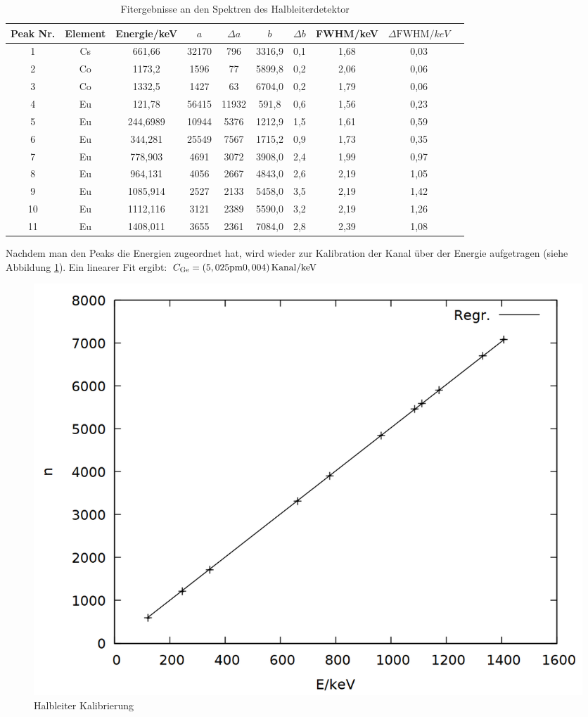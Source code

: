 \begin{table}
\caption{Fitergebnisse an den Spektren des Halbleiterdetektor}
\begin{tabular}{cccccccccc}
\toprule
Peak Nr. & Element & Energie/\si{keV}& $a$ & $\Delta a$ & $b$ & $\Delta b$ & FWHM/\si{keV} & $\Delta \text{FWHM}/\si{keV}$\\
\midrule 
1	&	Cs	&	661,66	&	32170	&	796	&	3316,9	&	0,1	&	1,68	&	0,03\\
2	&	Co	&	1173,2	&	1596	&	77	&	5899,8	&	0,2	&	2,06	&	0,06\\
3	&	Co	&	1332,5	&	1427	&	63	&	6704,0	&	0,2	&	1,79	&	0,06\\
4	&	Eu	&	121,78	&	56415	&	11932	&	591,8	&	0,6	&	1,56	&	0,23\\
5	&	Eu	&	244,6989	&	10944	&	5376	&	1212,9	&	1,5	&	1,61	&	0,59\\
6	&	Eu	&	344,281	&	25549	&	7567	&	1715,2	&	0,9	&	1,73	&	0,35\\
7	&	Eu	&	778,903	&	4691	&	3072	&	3908,0	&	2,4	&	1,99	&	0,97\\
8	&	Eu	&	964,131	&	4056	&	2667	&	4843,0	&	2,6	&	2,19	&	1,05\\
9	&	Eu	&	1085,914	&	2527	&	2133	&	5458,0	&	3,5	&	2,19	&	1,42\\
10	&	Eu	&	1112,116	&	3121	&	2389	&	5590,0	&	3,2	&	2,19	&	1,26\\
11	&	Eu	&	1408,011	&	3655	&	2361	&	7084,0	&	2,8	&	2,39	&	1,08\\
\bottomrule
\end{tabular}
\label{tab:ge}
\end{table}

Nachdem man den Peaks die Energien zugeordnet hat, wird wieder zur Kalibration der Kanal über der Energie aufgetragen (siehe Abbildung \ref{fig:ge_gauge}). Ein linearer Fit ergibt: $C\ind{Ge} = \si{(5,025\pm 0,004)\,Kanal/keV}$

\begin{figure}
\centering
\includegraphics[width=0.7\linewidth]{data/ge_gauge.png}
\caption{Halbleiter Kalibrierung}
\label{fig:ge_gauge}
\end{figure}

